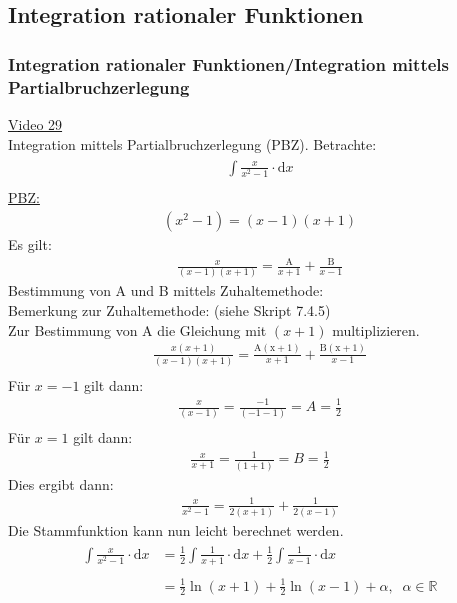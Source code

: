 \subsection{Integration rationaler Funktionen}
\subsubsection{ Integration rationaler Funktionen/Integration mittels Partialbruchzerlegung}
\href{https://youtu.be/QJQBrXdNNSA}{Video 29}\\
Integration mittels Partialbruchzerlegung (PBZ).
Betrachte:\\
\begin{align*}
\int\limits_{}^{} \frac{x}{x^2-1}\cdot \mathrm{d}x
\end{align*}
\underline{PBZ:}\\
\begin{align*}
(x^2-1)=(x-1)(x+1)
\end{align*}
Es gilt:\\
\begin{align*}
\frac{x}{(x-1)(x+1)}=\frac{\mathrm{A}}{x+1}+\frac{\mathrm{B}}{x-1}
\end{align*}
Bestimmung von A und B mittels Zuhaltemethode:\\
Bemerkung zur Zuhaltemethode: (siehe Skript 7.4.5)\\
Zur Bestimmung von A die Gleichung mit $ (x+1) $ multiplizieren.\\
\begin{align*}
\frac{x(x+1)}{(x-1)(x+1)}=\frac{\mathrm{A(x+1)}}{x+1}+\frac{\mathrm{B(x+1)}}{x-1}\\
\end{align*}
Für $ x=-1 $ gilt dann:\\
\begin{align*}
\frac{x}{(x-1)}=\frac{-1}{(-1-1)}=A=\frac{1}{2}\\
\end{align*}
Für $ x=1 $ gilt dann:\\
\begin{align*}
\frac{x}{x+1}=\frac{1}{(1+1)}=B=\frac{1}{2}
\end{align*}
Dies ergibt dann:\\
\begin{align*}
\frac{x}{x^2-1}=\frac{1}{2(x+1)}+\frac{1}{2(x-1)}
\end{align*}
Die Stammfunktion kann nun leicht berechnet werden.\\
\begin{align*}
\int\limits_{}^{} \frac{x}{x^2-1}\cdot \mathrm{d}x&=\frac{1}{2}\int\limits_{}^{} \frac{1}{x+1}\cdot \mathrm{d}x+\frac{1}{2}\int\limits_{}^{} \frac{1}{x-1}\cdot \mathrm{d}x\\
&=\frac{1}{2}\ln(x+1)+\frac{1}{2}\ln(x-1)+\alpha,\;\;\alpha\in \mathbb{R}
\end{align*}
